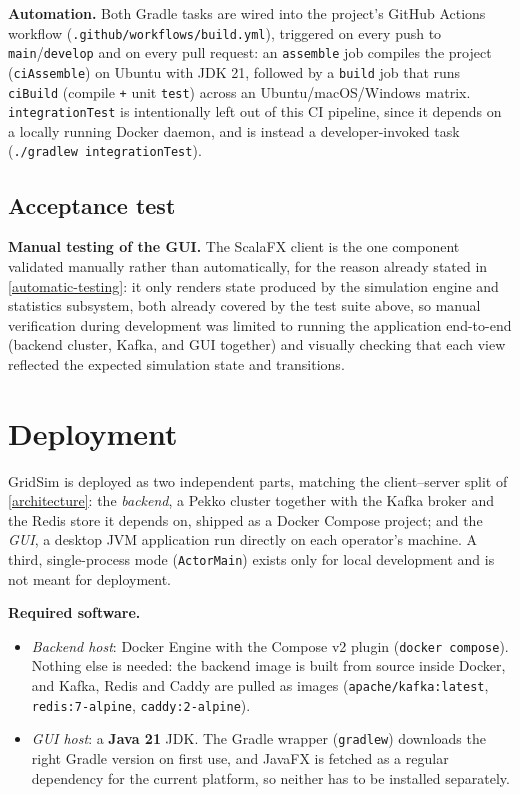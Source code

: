 \documentclass{scrreprt}
\begin{document}
\textbf{Automation.} Both Gradle tasks are wired into the project's GitHub Actions workflow
(\texttt{.github/workflows/build.yml}), triggered on every push to \texttt{main}/\texttt{develop}
and on every pull request: an \texttt{assemble} job compiles the project
(\texttt{ciAssemble}) on Ubuntu with JDK 21, followed by a \texttt{build} job that runs
\texttt{ciBuild} (compile \texttt{+} unit \texttt{test}) across an Ubuntu/macOS/Windows matrix.
\texttt{integrationTest} is intentionally left out of this CI pipeline, since it depends on a
locally running Docker daemon, and is instead a developer-invoked task
(\texttt{./gradlew integrationTest}).

\subsection{Acceptance test}\label{acceptance-test}

\textbf{Manual testing of the GUI.} The ScalaFX client is the one component validated manually
rather than automatically, for the reason already stated in \cref{automatic-testing}: it only
renders state produced by the simulation engine and statistics subsystem, both already covered
by the test suite above, so manual verification during development was limited to running the
application end-to-end (backend cluster, Kafka, and GUI together) and visually checking that
each view reflected the expected simulation state and transitions.

\section{Deployment}\label{deployment}

GridSim is deployed as two independent parts, matching the client--server split of
\cref{architecture}: the \emph{backend}, a Pekko cluster together with the Kafka broker and
the Redis store it depends on, shipped as a Docker Compose project; and the \emph{GUI}, a
desktop JVM application run directly on each operator's machine. A third, single-process mode
(\texttt{ActorMain}) exists only for local development and is not meant for deployment.

\textbf{Required software.}
\begin{itemize}
  \item \emph{Backend host}: Docker Engine with the Compose v2 plugin (\texttt{docker compose}).
  Nothing else is needed: the backend image is built from source inside Docker, and Kafka,
  Redis and Caddy are pulled as images (\texttt{apache/kafka:latest}, \texttt{redis:7-alpine},
  \texttt{caddy:2-alpine}).
  \item \emph{GUI host}: a \textbf{Java 21} JDK. The Gradle wrapper (\texttt{gradlew}) downloads
  the right Gradle version on first use, and JavaFX is fetched as a regular dependency for the
  current platform, so neither has to be installed separately.
\end{itemize}
\end{document}
